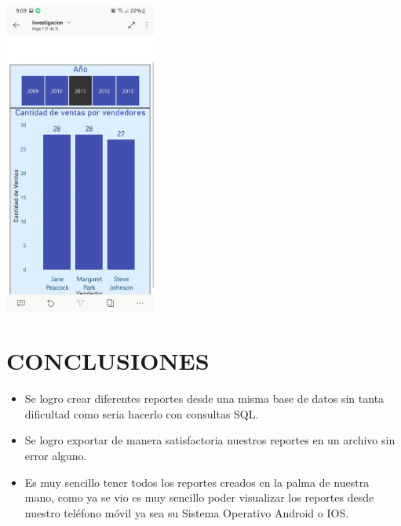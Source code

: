 \documentclass[12pt,letterpaper]{article}
\newcommand\tab[1][1cm]{\hspace*{#1}}
\begin{document}
\begin{enumerate}[\tab 1.]
\begin{itemize}
\begin{center}
                \includegraphics[width=5cm]{./img/img25.9.png}
            \end{center}
        \end{itemize}
    \end{enumerate}
    \newpage
    \section{CONCLUSIONES}
    \begin{itemize}
        \item Se logro crear diferentes reportes desde una misma base de datos sin tanta dificultad como seria hacerlo con consultas SQL.
        \item Se logro exportar de manera satisfactoria nuestros reportes en un archivo sin error alguno.
        \item Es muy sencillo tener todos los reportes creados en la palma de nuestra mano, como ya se vio es muy sencillo poder visualizar los reportes desde nuestro teléfono móvil ya sea su Sistema Operativo Android o IOS.
    \end{itemize}
    \newpage
\end{document}
